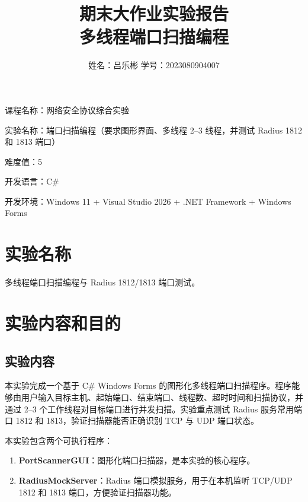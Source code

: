 \documentclass[UTF8,a4paper,12pt]{ctexart}
\title{\textbf{期末大作业实验报告}\\多线程端口扫描编程}
\author{姓名：吕乐彬 \quad 学号：2023080904007}
\begin{document}
\maketitle

\vspace{1em}

\noindent 课程名称：网络安全协议综合实验

\vspace{0.8em}

\noindent 实验名称：端口扫描编程（要求图形界面、多线程 2--3 线程，并测试 Radius 1812 和 1813 端口）

\vspace{0.8em}

\noindent 难度值：5

\vspace{0.8em}

\noindent 开发语言：C\#

\vspace{0.8em}

\noindent 开发环境：Windows 11 + Visual Studio 2026 + .NET Framework + Windows Forms

\vspace{1.5em}


\newpage
\tableofcontents
\newpage

\section{实验名称}

多线程端口扫描编程与 Radius 1812/1813 端口测试。

\section{实验内容和目的}

\subsection{实验内容}

本实验完成一个基于 C\# Windows Forms 的图形化多线程端口扫描程序。程序能够由用户输入目标主机、起始端口、结束端口、线程数、超时时间和扫描协议，并通过 2--3 个工作线程对目标端口进行并发扫描。实验重点测试 Radius 服务常用端口 1812 和 1813，验证扫描器能否正确识别 TCP 与 UDP 端口状态。

本实验包含两个可执行程序：

\begin{enumerate}[itemsep=2pt]
    \item \textbf{PortScannerGUI}：图形化端口扫描器，是本实验的核心程序。
    \item \textbf{RadiusMockServer}：Radius 端口模拟服务，用于在本机监听 TCP/UDP 1812 和 1813 端口，方便验证扫描器功能。
\end{enumerate}
\end{document}
